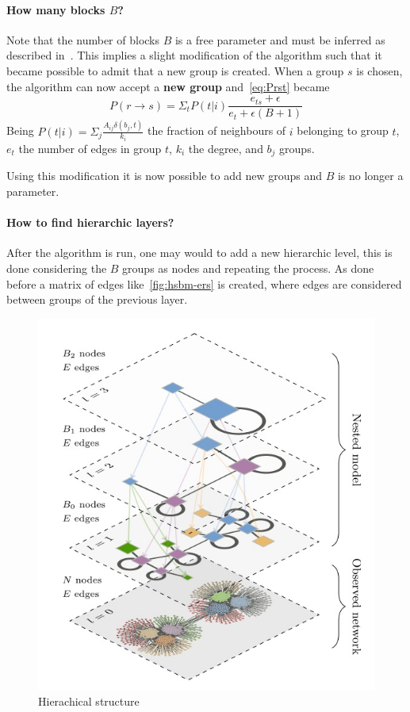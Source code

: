 \paragraph{How many blocks $B$?}
Note that the number of blocks $B$ is a free parameter and must be inferred as described in~\cite{peixoto2017nonparametric}.
This implies a slight modification of the algorithm such that
it became possible to admit that a new group is created.
When a group $s$ is chosen, the algorithm can now accept a \textbf{new group} and~\ref{eq:Prst} became
\begin{equation}\label{eq:PrstB1}
  P(r\to s)=\Sigma_t P(t|i)\frac{e_{ts}+\epsilon}{e_t+\epsilon (B+1)}
\end{equation}
Being $P(t|i)=\Sigma_j\frac{A_{ij}\delta(b_j, t)}{k_i}$ the fraction of neighbours of $i$ belonging to group $t$, $e_t$ the number of edges in group $t$,
$k_i$ the degree, and $b_j$ groups.

Using this modification it is now possible to add new groups and $B$ is no longer a parameter.

\paragraph{How to find hierarchic layers?}
After the algorithm is run, one may would to add a new hierarchic level, this is done considering the $B$ groups as nodes and repeating the process.
As done before a matrix of edges like~\ref{fig:hsbm-ers} is created, where edges
are considered between groups of the previous layer.

\begin{figure}
  \centering
  \includegraphics[width=0.6\linewidth]{pictures/topic/topic_peixioto_hierarchic.jpg}
  \caption{Hierachical structure}
  \label{fig:topic_peixioto_hierarchic}
\end{figure}

